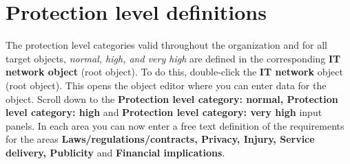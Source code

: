 \documentclass[a4paper,10pt]{book}
\begin{document}
\section{Protection level definitions}
The protection level categories valid throughout the organization and for all target objects,
{\em normal, high, and very high} are defined in the corresponding \textbf{IT network object} (root object).
To do this, double-click the \textbf{IT network} object (root object). This opens the object editor where
you can enter data for the object. Scroll down to the \textbf{Protection level category: normal, Protection level category: high}
and \textbf{Protection level category: very high} input panels. In each area you can now enter a free text definition of
the requirements for the areas \textbf{Laws/regulations/contracts, Privacy, Injury, Service delivery, Publicity}
and \textbf{Financial implications}.
\end{document}
